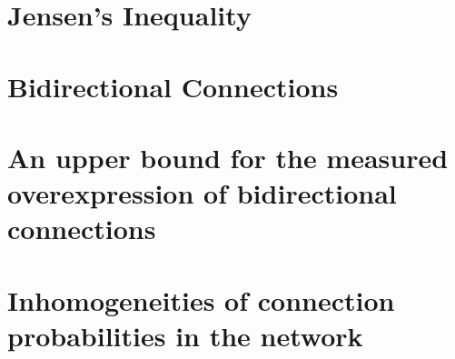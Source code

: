\documentclass{scrreprt}
\begin{document}
  

\section{Jensen's Inequality}

  

\section{Bidirectional Connections}

  

\section{An upper bound for the measured overexpression of bidirectional connections}

  

\section{Inhomogeneities of connection probabilities in the network}

  
  
  
\end{document}

